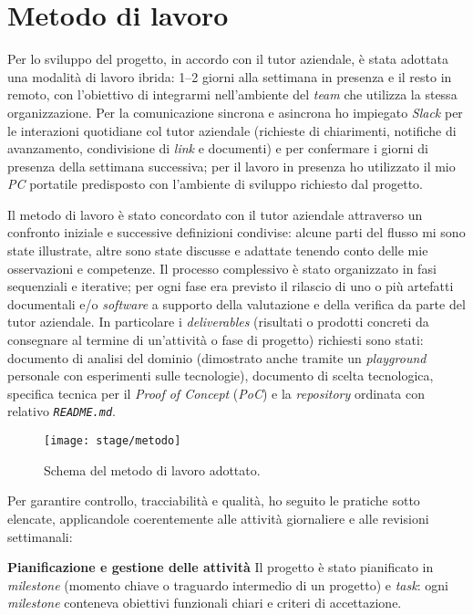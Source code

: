 \section{Metodo di lavoro}

Per lo sviluppo del progetto, in accordo con il tutor aziendale, è stata adottata una modalità di lavoro ibrida: 1–2 giorni alla settimana in presenza e il resto in remoto, 
con l'obiettivo di integrarmi nell'ambiente del \emph{team} che utilizza la stessa organizzazione. Per la comunicazione sincrona e asincrona ho impiegato 
\emph{Slack} per le interazioni quotidiane col tutor aziendale (richieste di chiarimenti, notifiche di avanzamento, condivisione di \emph{link} e documenti) e per confermare i giorni di presenza 
della settimana successiva; per il lavoro in presenza ho utilizzato il mio \emph{PC} portatile predisposto con l'ambiente di sviluppo richiesto dal progetto.

Il metodo di lavoro è stato concordato con il tutor aziendale attraverso un confronto iniziale e successive definizioni condivise: alcune parti del 
flusso mi sono state illustrate, altre sono state discusse e adattate tenendo conto delle mie osservazioni e competenze. 
Il processo complessivo è stato organizzato in fasi sequenziali e iterative; 
per ogni fase era previsto il rilascio di uno o più artefatti documentali e/o \emph{software} a supporto della valutazione e della verifica da parte del tutor aziendale. 
In particolare i \emph{deliverables} (risultati o prodotti concreti da consegnare al termine di un’attività o fase di progetto) richiesti sono stati: 
documento di analisi del dominio (dimostrato anche tramite un \emph{playground} personale con esperimenti sulle tecnologie), 
documento di scelta tecnologica, 
specifica tecnica per il \emph{Proof of Concept} (\emph{PoC}) 
e la \emph{repository} ordinata 
con relativo \texttt{\emph{README.md}}.

\begin{figure}[H]
    \centering
    \texttt{[image: stage/metodo]}
    \caption{Schema del metodo di lavoro adottato.}
    \label{fig:metodo}
\end{figure}

Per garantire controllo, tracciabilità e qualità, ho seguito le pratiche sotto elencate, applicandole coerentemente alle attività giornaliere e alle revisioni settimanali:

\medskip
\noindent\textbf{Pianificazione e gestione delle attività}
Il progetto è stato pianificato in \emph{milestone} (momento chiave o traguardo intermedio di un progetto) e \emph{task}: ogni \emph{milestone} conteneva obiettivi funzionali chiari e criteri di accettazione. 

